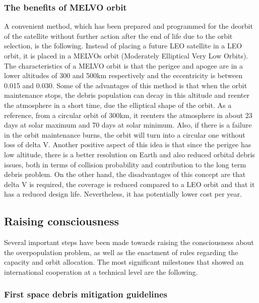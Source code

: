 \subsubsection{The benefits of MELVO orbit}
A convenient method, which has been prepared and programmed for the deorbit of the satellite without further action after the end of life due to the orbit selection, is the following. Instead of placing a future LEO satellite in a LEO orbit, it is placed in a MELVOs orbit (Moderately Elliptical Very Low Orbits). The characteristics of a MELVO orbit is that the perigee and apogee are in a lower altitudes of 300 and 500km respectively and the eccentricity is between 0.015 and 0.030. Some of the advantages of this method is that when the orbit maintenance stops, the debris population can decay in this altitude and reenter the atmosphere in a short time, due the elliptical shape of the orbit. As a reference, from a circular orbit of 300km, it reenters the atmosphere in about 23 days at solar maximum and 70 days at solar minimum. Also, if there is a failure in the orbit maintenance burns, the orbit will turn into a circular one without loss of delta V. Another positive aspect of this idea is that since the perigee has low altitude, there is a better resolution on Earth and also reduced orbital debris issues, both in terms of collision probability and contribution to the long term debris problem. \cite{Kramer 2002} On the other hand, the disadvantages of this concept are that delta V is required, the coverage is reduced compared to a LEO orbit and that it has a reduced design life. Nevertheless, it has potentially lower cost per year.



\bigskip
\subsection{Raising consciousness}
\bigskip

Several important steps have been made towards raising the consciousness about the overpopulation problem, as well as the enactment of rules regarding the capacity and orbit allocation. The most significant milestones that showed an international cooperation at a technical level are the following.

\bigskip
\subsubsection{First space debris mitigation guidelines}
\bigskip


